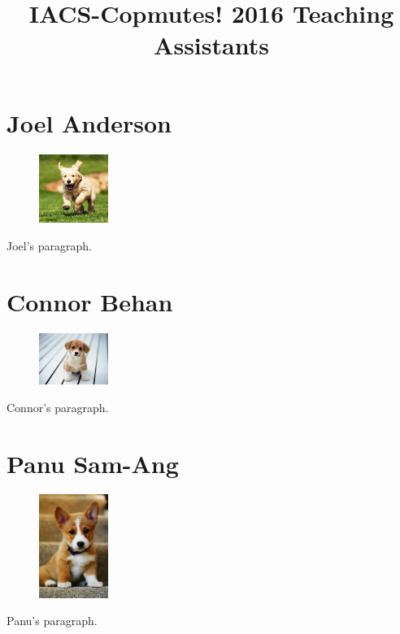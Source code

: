 \documentclass[]{article}
\begin{document}
\title{IACS-Copmutes! 2016 Teaching Assistants}

\section*{Joel Anderson} {
\begin{figure}
\begin{centering}
    \includegraphics[width=0.2\textwidth]{puppy.jpeg}
\end{centering}
\end{figure}
Joel's paragraph. }
\vspace{1.25 in}

\section*{Connor Behan} {
\begin{figure}
\begin{centering}
    \includegraphics[width=0.2\textwidth]{puppy2.jpeg}
\end{centering}
\end{figure}
Connor's paragraph. }
\vspace{1.25 in}

\section*{Panu Sam-Ang} {
\begin{figure}
\begin{centering}
    \includegraphics[width=0.2\textwidth]{puppy3.jpeg}
\end{centering}
\end{figure}
Panu's paragraph. }
\vspace{1.2 in}
\end{document}
